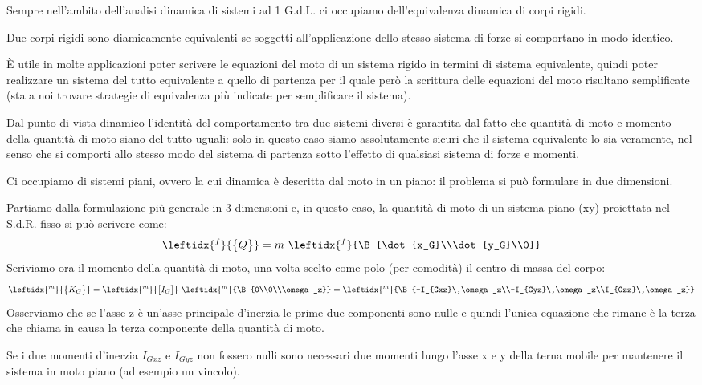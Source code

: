 Sempre nell'ambito dell'analisi dinamica di sistemi ad 1 G.d.L. ci occupiamo dell'equivalenza dinamica di corpi rigidi.

Due corpi rigidi sono diamicamente equivalenti  se soggetti all'applicazione dello stesso sistema di forze si comportano in modo identico.

È utile in molte applicazioni poter scrivere le equazioni del moto di un sistema rigido in termini di sistema equivalente, quindi poter realizzare un sistema del tutto equivalente a quello di partenza per il quale però la scrittura delle equazioni del moto risultano semplificate (sta a noi trovare strategie di equivalenza più indicate per semplificare il sistema).

Dal punto di vista dinamico l'identità del comportamento tra due sistemi diversi è garantita dal fatto che quantità di moto e momento della quantità di moto siano del tutto uguali: solo in questo caso siamo assolutamente sicuri che il sistema equivalente lo sia veramente, nel senso che si comporti allo stesso modo del sistema di partenza sotto l'effetto di qualsiasi sistema di forze e momenti.

Ci occupiamo di sistemi piani, ovvero la cui dinamica è descritta dal moto in un piano: il problema si può formulare in due dimensioni.

Partiamo dalla formulazione più generale in 3 dimensioni e, in questo caso, la quantità di moto di un sistema piano (xy) proiettata nel S.d.R. fisso si può scrivere come:
\[\leftidx{^f}{\B{Q}} = m\,\,\leftidx{^f}{\B{\dot{x_G}\\\dot{y_G}\\0}}\]
Scriviamo ora il momento della quantità di moto, una volta scelto come polo (per comodità) il centro di massa del corpo:
\[\leftidx{^m}{\B{K_G}} = \leftidx{^m}{\M{I_G}}\,\,\leftidx{^m}{\B{0\\0\\\omega_z}} = \leftidx{^m}{\B{-I_{Gxz}\,\omega_z\\-I_{Gyz}\,\omega_z\\I_{Gzz}\,\omega_z}}\]
Osserviamo che se l'asse z è un'asse principale d'inerzia le prime due componenti sono nulle e quindi l'unica equazione che rimane è la terza che chiama in causa la terza componente della quantità di moto.

Se i due  momenti d'inerzia $I_{Gxz}$ e $I_{Gyz}$ non fossero nulli sono necessari due momenti lungo l'asse x e y della terna mobile per mantenere il sistema in moto piano (ad esempio un vincolo).

